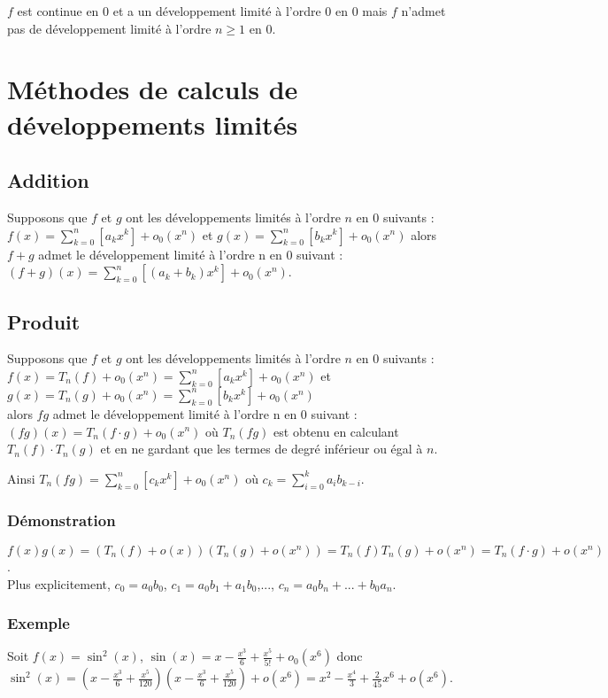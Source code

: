 \documentclass[a4paper,10pt]{book} %
\newcommand{\dl}{développement limité }
\begin{document}
$f$ est continue en 0 et a un \dl à l'ordre 0 en 0 mais $f$ n'admet pas de \dl à l'ordre $n\geq 1$ en 0.

\newpage

\section{Méthodes de calculs de développements limités}
\subsection{Addition}
Supposons que $f$ et $g$ ont les développements limités à l'ordre $n$ en 0 suivants :\\
$\displaystyle f(x)=\sum\limits_{k=0}^{n}[a_kx^{k}]+o_0(x^{n})$ et 
$\displaystyle g(x)=\sum\limits_{k=0}^{n}[b_kx^{k}]+o_0(x^{n})$ alors $f+g$ admet le \dl à l'ordre n en 0 suivant : 
$\displaystyle (f+g)(x)=\sum\limits_{k=0}^{n}[(a_k+b_k)x^{k}]+o_0(x^{n})$.

\subsection{Produit}
Supposons que $f$ et $g$ ont les développements limités à l'ordre $n$ en 0 suivants :\\
$\displaystyle f(x)=T_n(f)+o_0(x^{n})=\sum\limits_{k=0}^{n}[a_kx^{k}]+o_0(x^{n})$ et 
$\displaystyle g(x)=T_n(g)+o_0(x^{n})=\sum\limits_{k=0}^{n}[b_kx^{k}]+o_0(x^{n})$\\
alors $fg$ admet le \dl à l'ordre n en 0 suivant :\\
$(fg)(x)=T_n(f\cdot g)+o_0(x^n)$ où $T_n(fg)$ est obtenu en calculant $T_n(f)\cdot T_n(g)$ et en ne gardant que les termes de degré inférieur ou égal à $n$.

Ainsi $\displaystyle T_n(fg)=\sum\limits_{k=0}^{n}[c_kx^{k}]+o_0(x^{n})$ où $\displaystyle c_k=\sum_{i=0}^{k}a_ib_{k-i}$.

\subsubsection{Démonstration}
$f(x)g(x)=(T_n(f)+o(x))(T_n(g)+o(x^n))=T_n(f)T_n(g)+o(x^n)=T_n(f\cdot g)+o(x^n)$.\\

Plus explicitement, $c_0=a_0b_0$, $c_1=a_0b_1+a_1b_0$,..., $c_n=a_0b_n+...+b_0a_n$.

\subsubsection{Exemple}
Soit $f(x)=\sin^2(x)$, $\sin(x)=x-\frac{x^3}{6}+\frac{x^5}{5!}+o_0(x^6)$ donc\\
$\sin^2(x)=(x-\frac{x^3}{6}+\frac{x^5}{120})(x-\frac{x^3}{6}+\frac{x^5}{120})+o(x^6)=x^2-\frac{x^4}{3}+\frac{2}{45}x^6+o(x^6)$.\\
\end{document}
